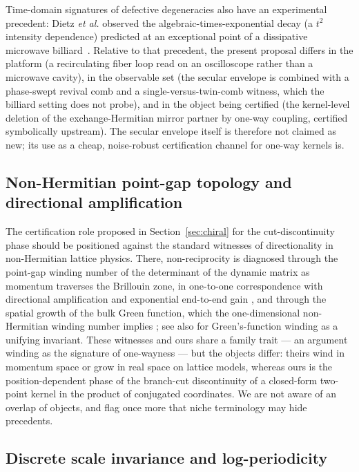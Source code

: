\documentclass[11pt,a4paper]{article}
\begin{document}
Time-domain signatures of defective degeneracies also have an experimental
precedent: Dietz \emph{et al.} observed the algebraic-times-exponential decay
(a $t^{2}$ intensity dependence) predicted at an exceptional point of a
dissipative microwave billiard~\cite{Dietz2007}. Relative to that precedent,
the present proposal differs in the platform (a recirculating fiber loop read
on an oscilloscope rather than a microwave cavity), in the observable set (the
secular envelope is combined with a phase-swept revival comb and a
single-versus-twin-comb witness, which the billiard setting does not
probe), and in the object being certified (the kernel-level deletion of the
exchange-Hermitian mirror partner by one-way coupling, certified symbolically
upstream). The secular envelope itself is therefore not claimed as new; its
use as a cheap, noise-robust certification channel for one-way kernels is.

\subsection{Non-Hermitian point-gap topology and directional amplification}
\label{sec:nhtopo}

The certification role proposed in Section~\ref{sec:chiral} for the
cut-discontinuity phase should be positioned against the standard
witnesses of directionality in non-Hermitian lattice physics. There,
non-reciprocity is diagnosed through the point-gap winding number of the
determinant of the dynamic matrix as momentum traverses the Brillouin
zone, in one-to-one correspondence with directional amplification and
exponential end-to-end gain \cite{Wanjura2020}, and through the spatial
growth of the bulk Green function, which the one-dimensional
non-Hermitian winding number implies \cite{Zirnstein2021}; see
also \cite{HuWang2023} for Green's-function winding as a unifying
invariant. These witnesses and ours share a family trait --- an argument
winding as the signature of one-wayness --- but the objects differ:
theirs wind in momentum space or grow in real space on lattice models,
whereas ours is the position-dependent phase of the branch-cut
discontinuity of a closed-form two-point kernel in the product of
conjugated coordinates. We are not aware of an overlap of objects, and
flag once more that niche terminology may hide precedents.

\subsection{Discrete scale invariance and log-periodicity}
\label{sec:dsi}
\end{document}
